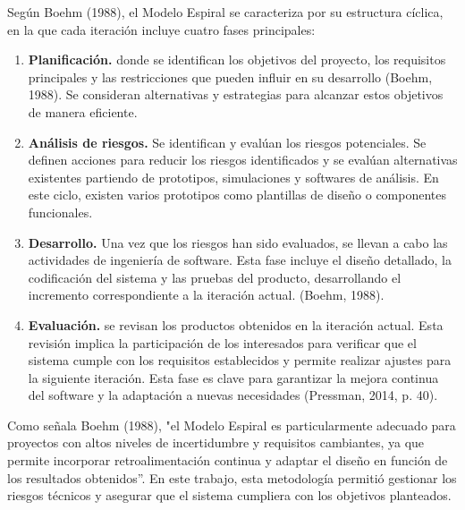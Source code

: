Según Boehm (1988), el Modelo Espiral se caracteriza por su estructura cíclica, en la que cada iteración incluye cuatro fases principales:

\begin{enumerate}
  \item \textbf{Planificación.} donde se identifican los objetivos del proyecto, los requisitos principales y las restricciones que pueden influir en su desarrollo (Boehm, 1988). Se consideran alternativas y estrategias para alcanzar estos objetivos de manera eficiente.
  \item \textbf{Análisis de riesgos.} Se identifican y evalúan los riesgos potenciales. Se definen acciones para reducir los riesgos identificados y se evalúan alternativas existentes partiendo de prototipos, simulaciones y softwares de análisis. En este ciclo, existen varios prototipos como plantillas de diseño o componentes funcionales.
  \item \textbf{Desarrollo.} Una vez que los riesgos han sido evaluados, se llevan a cabo las actividades de ingeniería de software. Esta fase incluye el diseño detallado, la codificación del sistema y las pruebas del producto, desarrollando el incremento correspondiente a la iteración actual. (Boehm, 1988).
  \item \textbf{Evaluación.} se revisan los productos obtenidos en la iteración actual. Esta revisión implica la participación de los interesados para verificar que el sistema cumple con los requisitos establecidos y permite realizar ajustes para la siguiente iteración. Esta fase es clave para garantizar la mejora continua del software y la adaptación a nuevas necesidades (Pressman, 2014, p. 40).
\end{enumerate}

Como señala Boehm (1988), "el Modelo Espiral es particularmente adecuado para proyectos con altos niveles de incertidumbre y requisitos cambiantes, ya que permite incorporar retroalimentación continua y adaptar el diseño en función de los resultados obtenidos”. En este trabajo, esta metodología permitió gestionar los riesgos técnicos y asegurar que el sistema cumpliera con los objetivos planteados.

